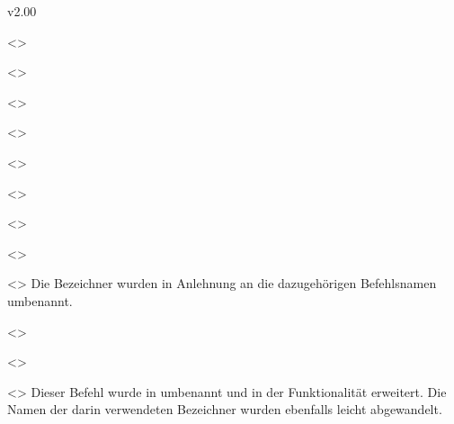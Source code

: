 \begin{Entity}{}
\begin{NoIndexDefault}
\begin{Cessations}{v2.00}
\begin{Entity}{}
\begin{Cessation}
  {}
  <>
\begin{Cessation}
  {}
  <>
\begin{Cessation}
  {}
  <>
\begin{Cessation}
  {}
  <>
\begin{Cessation}
  {}
  <>
\begin{Cessation}
  {}
  <>
\begin{Cessation}
  {}
  <>
\begin{Cessation}
  {}
  <>
\begin{Cessation}
  {}
  <>
\printdeclarationlist
%
Die Bezeichner wurden in Anlehnung an die dazugehörigen Befehlsnamen umbenannt.
\end{Cessation}
\end{Cessation}
\end{Cessation}
\end{Cessation}
\end{Cessation}
\end{Cessation}
\end{Cessation}
\end{Cessation}
\end{Cessation}

\begin{Cessation}
  {}
  <>
\begin{Cessation}
  {}
  <>
\begin{Cessation}
  {}
  <>
\printdeclarationlist
%
Dieser Befehl wurde in  umbenannt und in der Funktionalität 
erweitert. Die Namen der darin verwendeten Bezeichner wurden ebenfalls leicht 
abgewandelt.
\end{Cessation}
\end{Cessation}
\end{Cessation}
\end{Entity}
\end{Cessations}




\end{NoIndexDefault}
\end{Entity}
